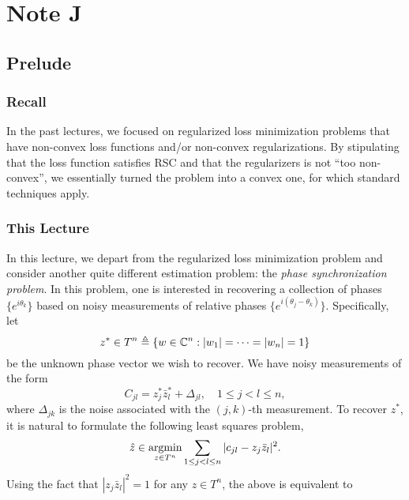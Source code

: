 \clearpage
\section{Note J}

\subsection{Prelude}

\subsubsection{Recall}

In the past lectures,
we focused on regularized loss minimization problems that have
non-convex loss functions and/or non-convex regularizations.
By stipulating that the loss function satisfies RSC and that
the regularizers is not ``too non-convex'',
we essentially turned the problem into a convex one,
for which standard techniques apply.

\subsubsection{This Lecture}

In this lecture,
we depart from the regularized loss minimization problem and
consider another quite different estimation problem:
the \emph{phase synchronization problem}.
In this problem,
one is interested in recovering a collection of phases $\{e^{i\theta_k}\}$
based on noisy measurements of relative phases $\{e^{i(\theta_j-\theta_k)}\}$.
Specifically,
let
\begin{equation}
    z^*\in T^n\triangleq\{w\in{\mathbb{C}}^n:|w_1|=\cdots=|w_n|=1\}
\end{equation}
be the unknown phase vector we wish to recover.
We have noisy measurements of the form
\begin{equation}\label{eq:probj}
    C_{jl}=z_j^*\bar z_l^*+\Delta_{jl},\quad 1\le j<l\le n,
\end{equation}
where $\Delta_{jk}$ is the noise associated with the $(j,k)$-th measurement.
To recover $z^*$,
it is natural to formulate the following least squares problem,
\begin{equation}
    \hat z \in\mathop{\mathrm{argmin}}_{z\in T^n}\sum_{1\le j<l\le n}|c_{jl}-z_j\bar z_l|^2.
\end{equation}
Using the fact that $|z_j\bar z_l|^2=1$ for any $z\in T^n$,
the above is equivalent to

